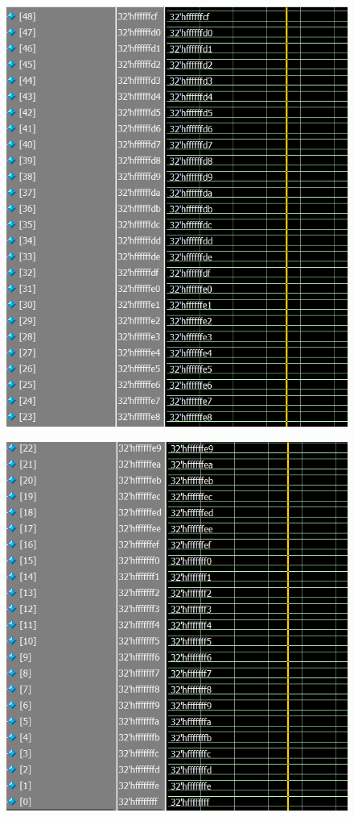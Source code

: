 \documentclass[conference]{IEEEtran}
\begin{document}
	\begin{figure}[H]
		\centering
		\includegraphics[width=\columnwidth]{Files/full_mem_val8}
		\caption{}
		\label{fig:fullmemval8}
	\end{figure}
	
	\begin{figure}[H]
		\centering
		\includegraphics[width=\columnwidth]{Files/full_mem_val9}
		\caption{}
		\label{fig:fullmemval9}
	\end{figure}
	
\end{document}
